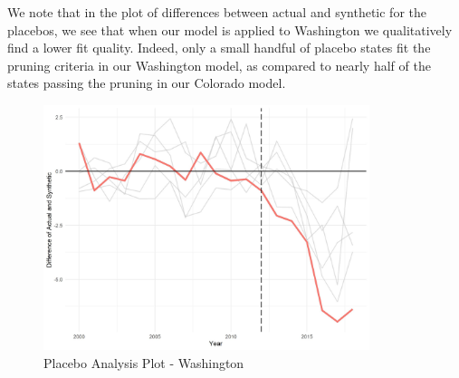\documentclass{article}
\begin{document}
We note that in the plot of differences between actual and synthetic for the placebos, we see that when our model is applied to Washington we qualitatively find a lower fit quality. Indeed, only a small handful of placebo states fit the pruning criteria in our Washington model, as compared to nearly half of the states  passing the pruning in our Colorado model.

\begin{figure}[H]
	\begin{center}
		\includegraphics[width=0.85\textwidth]{placebos_plot_washington}
	\end{center}
	\caption{Placebo Analysis Plot - Washington}
	\label{fig:placebos_plot_washington}
\end{figure}
\end{document}
